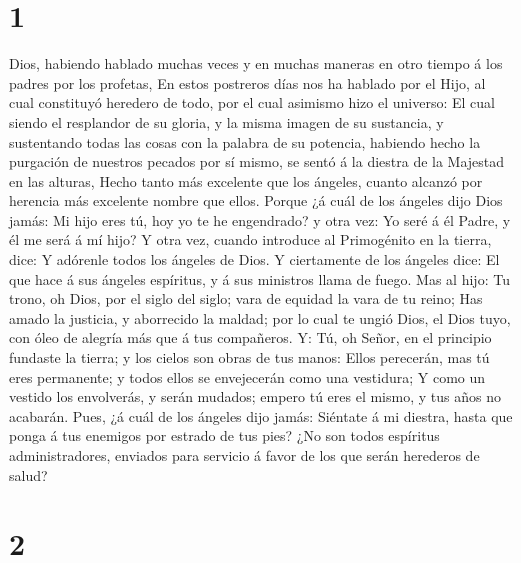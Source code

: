 \hypertarget{section}{%
\section{1}\label{section}}

 Dios, habiendo hablado muchas veces y en muchas maneras
en otro tiempo á los padres por los profetas,  En estos
postreros días nos ha hablado por el Hijo, al cual constituyó heredero
de todo, por el cual asimismo hizo el universo:  El cual
siendo el resplandor de su gloria, y la misma imagen de su sustancia, y
sustentando todas las cosas con la palabra de su potencia, habiendo
hecho la purgación de nuestros pecados por sí mismo, se sentó á la
diestra de la Majestad en las alturas,  Hecho tanto más
excelente que los ángeles, cuanto alcanzó por herencia más excelente
nombre que ellos.  Porque ¿á cuál de los ángeles dijo Dios
jamás: Mi hijo eres tú, hoy yo te he engendrado? y otra vez: Yo seré á
él Padre, y él me será á mí hijo?  Y otra vez, cuando
introduce al Primogénito en la tierra, dice: Y adórenle todos los
ángeles de Dios.  Y ciertamente de los ángeles dice: El
que hace á sus ángeles espíritus, y á sus ministros llama de fuego.
 Mas al hijo: Tu trono, oh Dios, por el siglo del siglo;
vara de equidad la vara de tu reino;  Has amado la
justicia, y aborrecido la maldad; por lo cual te ungió Dios, el Dios
tuyo, con óleo de alegría más que á tus compañeros.  Y:
Tú, oh Señor, en el principio fundaste la tierra; y los cielos son obras
de tus manos:  Ellos perecerán, mas tú eres permanente; y
todos ellos se envejecerán como una vestidura;  Y como un
vestido los envolverás, y serán mudados; empero tú eres el mismo, y tus
años no acabarán.  Pues, ¿á cuál de los ángeles dijo
jamás: Siéntate á mi diestra, hasta que ponga á tus enemigos por estrado
de tus pies?  ¿No son todos espíritus administradores,
enviados para servicio á favor de los que serán herederos de salud?

\hypertarget{section-1}{%
\section{2}\label{section-1}}

